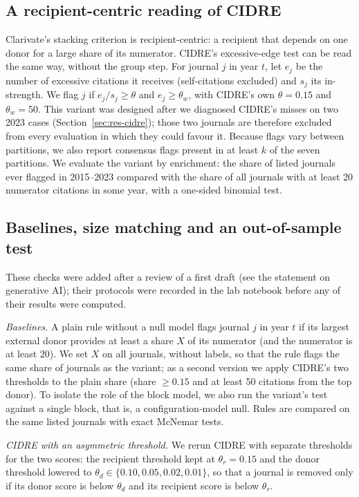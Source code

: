 \subsection{A recipient-centric reading of CIDRE}
Clarivate's stacking criterion is recipient-centric: a recipient that depends on one donor for a large share of its
numerator. CIDRE's excessive-edge test can be read the same way, without the group step. For journal $j$ in year
$t$, let $e_j$ be the number of excessive citations it receives (self-citations excluded) and $s_j$ its in-strength.
We flag $j$ if $e_j/s_j \ge \theta$ and $e_j \ge \theta_w$, with CIDRE's own $\theta=0.15$ and $\theta_w=50$. This
variant was designed after we diagnosed CIDRE's misses on two 2023 cases (Section~\ref{sec:res-cidre}); those two
journals are therefore excluded from every evaluation in which they could favour it. Because flags vary between
partitions, we also report consensus flags present in at least $k$ of the seven partitions. We evaluate the variant by
enrichment: the share of listed journals ever flagged in 2015--2023 compared with the share of all journals with at
least 20 numerator citations in some year, with a one-sided binomial test.

\subsection{Baselines, size matching and an out-of-sample test}\label{sec:m-robust}
These checks were added after a review of a first draft (see the statement on generative AI); their protocols were recorded in the lab notebook
before any of their results were computed.

\emph{Baselines.} A plain rule without a null model flags journal $j$ in year $t$ if its largest external donor
provides at least a share $X$ of its numerator (and the numerator is at least 20). We set $X$ on all journals, without
labels, so that the rule flags the same share of journals as the variant; as a second version we apply CIDRE's two
thresholds to the plain share (share $\ge0.15$ and at least 50 citations from the top donor). To isolate the role of
the block model, we also run the variant's test against a single block, that is, a configuration-model null. Rules are
compared on the same listed journals with exact McNemar tests.

\emph{CIDRE with an asymmetric threshold.} We rerun CIDRE with separate thresholds for the two scores: the recipient
threshold kept at $\theta_r=0.15$ and the donor threshold lowered to $\theta_d\in\{0.10,0.05,0.02,0.01\}$, so that a
journal is removed only if its donor score is below $\theta_d$ and its recipient score is below $\theta_r$.

